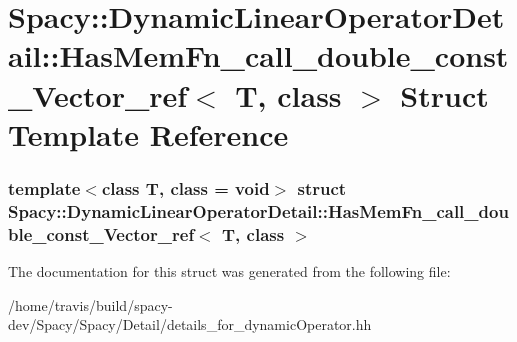 \hypertarget{structSpacy_1_1DynamicLinearOperatorDetail_1_1HasMemFn__call__double__const__Vector__ref}{\section{\-Spacy\-:\-:\-Dynamic\-Linear\-Operator\-Detail\-:\-:\-Has\-Mem\-Fn\-\_\-call\-\_\-double\-\_\-const\-\_\-\-Vector\-\_\-ref$<$ \-T, class $>$ \-Struct \-Template \-Reference}
\label{structSpacy_1_1DynamicLinearOperatorDetail_1_1HasMemFn__call__double__const__Vector__ref}
}
\subsubsection*{template$<$class T, class = void$>$ struct Spacy\-::\-Dynamic\-Linear\-Operator\-Detail\-::\-Has\-Mem\-Fn\-\_\-call\-\_\-double\-\_\-const\-\_\-\-Vector\-\_\-ref$<$ T, class $>$}



\-The documentation for this struct was generated from the following file\-:\begin{DoxyCompactItemize}
\item 
/home/travis/build/spacy-\/dev/\-Spacy/\-Spacy/\-Detail/details\-\_\-for\-\_\-dynamic\-Operator.\-hh\end{DoxyCompactItemize}
